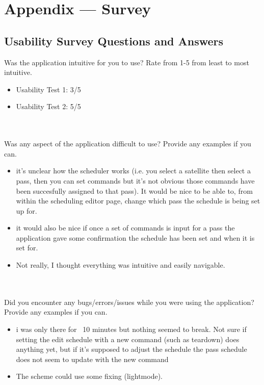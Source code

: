 \documentclass[12pt, titlepage]{article}
\begin{document}
\section{Appendix --- Survey}
\subsection{Usability Survey Questions and Answers}

Was the application intuitive for you to use? Rate from 1-5 from least to most intuitive.

\begin{itemize}
    \item Usability Test 1: 3/5
    \item Usability Test 2: 5/5
\end{itemize}

\\ \\

Was any aspect of the application difficult to use? Provide any examples if you can. 

\begin{itemize}
    \item it's unclear how the scheduler works (i.e. you select a satellite then select a pass, then you can set commands but it's not obvious those commands have been succesfully assigned to that pass). It would be nice to be able to, from within the scheduling editor page, change which pass the schedule is being set up for.
    \item it would also be nice if once a set of commands is input for a pass the application gave some confirmation the schedule has been set and when it is set for.
    \item Not really, I thought everything was intuitive and easily navigable.
\end{itemize}

\\ \\

Did you encounter any bugs/errors/issues while you were using the application? Provide any examples if you can.

\begin{itemize}
    \item i was only there for ~10 minutes but nothing seemed to break. Not sure if setting the edit schedule with a new command (such as teardown) does anything yet, but if it's supposed to adjust the schedule the pass schedule does not seem to update with the new command
    \item The scheme could use some fixing (light\dark mode).
\end{itemize}
\end{document}
